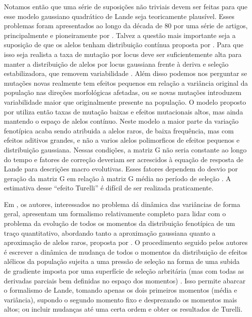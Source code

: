 Notamos então que uma série de suposições não triviais devem ser feitas
para que esse modelo gaussiano quadrático de Lande seja teoricamente
plausível. 
Esses problemas foram apresentados ao longo da década de 80 por uma
série de artigos, principalmente e pioneiramente por \citep{Turelli1984,
Turelli1985, Turelli1986, Barton1987}. 
Talvez a questão mais importante seja a suposição de que os alelos
tenham distribuição contínua proposta por \cite{Crow1964}. 
Para que isso seja realista a taxa de mutação por locus deve ser
suficientemente alta para manter a distribuição de alelos por locus
gaussiana frente à deriva e seleção estabilizadora, que removem
variabilidade \citep{Falconer1996}. 
Além disso podemos nos perguntar se mutações novas realmente tem efeitos
pequenos em relação a variância original da população nas direções
morfológicas afetadas, ou se novas mutações introduzem variabilidade
maior que originalmente presente na população. 
O modelo proposto por \cite{Turelli1984} utiliza então taxas de mutação
baixas e efeitos mutacionais altos, mas ainda mantendo o espaço de
alelos contínuo. 
Neste modelo a maior parte da variação fenotípica acaba sendo atribuida
a alelos raros, de baixa frequência, mas com efeitos aditivos grandes, e
não a varios alelos polimorficos de efeitos pequenos e distribuição
gaussiana. 
Nessas condições, a matriz G não seria constante ao longo do tempo e
fatores de correção deveriam ser acrescidos à equação de resposta de
Lande para descrições macro evolutivas. 
Esses fatores dependem do desvio por geração da matriz G em relação à
matriz G média no período de seleção \citep{Jones2003}. 
A estimativa desse ``efeito Turelli'' é difícil de ser realizada
praticamente. 

Em \cite{Barton1987}, os autores, interessados no problema dá dinâmica
das variâncias de forma geral, apresentam um formalismo relativamente
completo para lidar com o problema da evolução de todos os momentos da
distribuição fenotípica de um traço quantitativo, abordando tanto a
aproximação gaussiana quanto a aproximação de alelos raros, proposta por
\cite{Turelli1984}. 
O procedimento seguido pelos autores é escrever a dinâmica de mudança de
todos o momentos da distribuição de efeitos alélicos da população
sujeita a uma pressão de seleção na forma de uma subida de gradiente
imposta por uma superfície de seleção arbritária (mas com todas as
derivadas parciais bem definidas no espaço dos momentos)
\citep{Arnold2001a}. 
Isso permite abarcar o formalismo de Lande, tomando apenas os dois
primeiros momentos (média e variância), supondo o segundo momento fixo e
desprezando os momentos mais altos; ou incluir mudanças até uma certa
ordem e obter os resultados de Turelli. 

